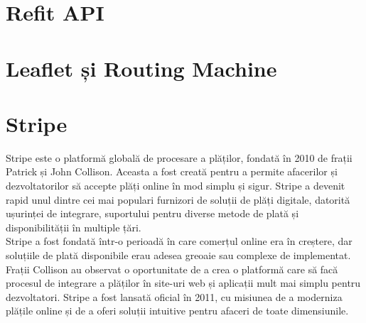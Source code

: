 \section{Refit API}
\section{Leaflet și Routing Machine}
\section{Stripe}
 {\hspace*{1cm} Stripe este o platformă globală de procesare a plăților, fondată în 2010 de frații Patrick și
  John Collison. Aceasta a fost creată pentru a permite afacerilor și dezvoltatorilor să accepte plăți
  online în mod simplu și sigur. Stripe a devenit rapid unul dintre cei mai populari furnizori de
  soluții de plăți digitale, datorită ușurinței de integrare, suportului pentru diverse metode de plată
  și disponibilității în multiple țări.}\parencite{stripe}\\
{\hspace*{1cm} Stripe a fost fondată într-o perioadă în care comerțul online era în creștere, dar soluțiile de
plată disponibile erau adesea greoaie sau complexe de implementat. Frații Collison au observat o
oportunitate de a crea o platformă care să facă procesul de integrare a plăților în site-uri web și
aplicații mult mai simplu pentru dezvoltatori. Stripe a fost lansată oficial în 2011, cu misiunea de
a moderniza plățile online și de a oferi soluții intuitive pentru afaceri de toate dimensiunile.}\parencite{stripe}